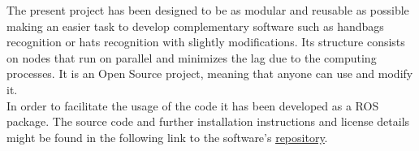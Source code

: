 The present project has been designed to be as modular and reusable as possible making an easier task to develop complementary software such as handbags recognition or hats recognition with slightly modifications. Its structure consists on nodes that run on parallel and minimizes the lag due to the computing processes. It is an Open Source project, meaning that anyone can use and modify it.
\\

In order to facilitate the usage of the code it has been developed as a ROS \cite{ros} package. The source code and further installation instructions and license details might be found in the following link to the software's \href{http://github.com/irenesanznieto/ocular}{\color{blue}\underline {repository}}. 
